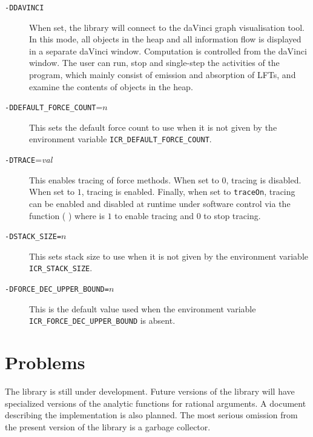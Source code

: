 \documentclass[a4paper,12pt]{article}
\begin{document}
\begin{description}
\item[\texttt{-DDAVINCI}]\quad When set, the library will connect to the daVinci
graph visualisation tool. In this mode, all objects in the heap and
all information flow is displayed in a separate daVinci window.
Computation is controlled from the daVinci window. The user can run, stop
and single-step the activities of the program,
which mainly consist of emission and absorption of LFTs,
and examine the contents of objects in the heap.
\item[\texttt{-DDEFAULT{\_}FORCE{\_}COUNT}=$n$]
\quad This sets the default force count to use when it is not given by
the environment variable
\texttt{ICR{\_}DEFAULT{\_}FORCE{\_}COUNT}.
\item[\texttt{-DTRACE}=\textit{val}]\quad This enables tracing of force methods.
When set to $0$, tracing is disabled. When set to $1$, tracing is enabled. 
Finally, when set to \texttt{traceOn}, tracing can be enabled
and disabled at runtime under software control via the function
( ) where  is $1$ to enable
tracing and $0$ to stop tracing.
\item[\texttt{-DSTACK{\_}SIZE=$n$}]
\quad This sets stack size to use when it is not given by
the environment variable 
\texttt{ICR{\_}STACK{\_}SIZE}.
\item[\texttt{-DFORCE{\_}DEC{\_}UPPER{\_}BOUND=$n$}]
\quad This is the default value used when the environment variable
\texttt{ICR{\_}FORCE{\_}DEC{\_}UPPER{\_}BOUND} is absent.
\end{description}

\section{Problems}

The library is still under development. Future versions of the library
will have specialized versions of the analytic functions
for rational arguments. A document describing the implementation
is also planned. The most serious omission from the present
version of the library is a garbage collector.
\end{document}
